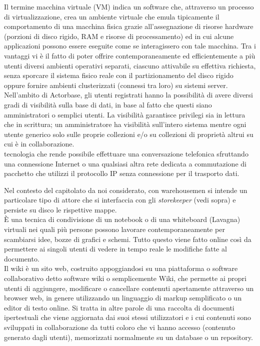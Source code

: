 \documentclass{scalatekids-article}
\begin{document}
   Il termine macchina virtuale (VM) indica un software che, attraverso un processo di virtualizzazione, crea un ambiente virtuale che emula tipicamente il comportamento di una macchina fisica grazie all'assegnazione di risorse hardware (porzioni di disco rigido, RAM e risorse di processamento) ed in cui alcune applicazioni possono essere eseguite come se interagissero con tale macchina.
  Tra i vantaggi vi è il fatto di poter offrire contemporaneamente ed efficientemente a più utenti diversi ambienti operativi separati, ciascuno attivabile su effettiva richiesta, senza sporcare il sistema fisico reale con il partizionamento del disco rigido oppure fornire ambienti clusterizzati (connessi tra loro) su sistemi server.
  \\

   Nell'ambito di Actorbase, gli utenti registrati hanno la possibilità di avere diversi gradi di visibilità sulla base di dati, in base al fatto che questi siano amministratori o semplici utenti.
  La visibilità garantisce privilegi sia in lettura che in scrittura; un amministratore ha visibilità sull'intero sistema mentre ogni utente generico solo sulle proprie collezioni e/o su collezioni di proprietà altrui su cui è in collaborazione.
  \\

   tecnologia che rende possibile effettuare una conversazione telefonica sfruttando una connessione Internet o una qualsiasi altra rete dedicata a commutazione di pacchetto che utilizzi il protocollo IP senza connessione per il trasporto dati.
  \\


   Nel contesto del capitolato da noi considerato, con warehousemen si intende un particolare tipo di attore che si interfaccia con gli \textit{storekeeper} (vedi sopra) e persiste su disco le rispettive mappe.
  \\

   È una tecnica di condivisione di un notebook o di una whiteboard (Lavagna) virtuali nei quali più persone possono lavorare contemporaneamente per scambiarsi idee, bozze di grafici e schemi.
  Tutto questo viene fatto online così da permettere ai singoli utenti di vedere in tempo reale le modifiche fatte al documento.
  \\

   Il wiki è un sito web, costruito appoggiandosi su una piattaforma o software collaborativo detto software wiki o semplicemente Wiki, che permette ai propri utenti di aggiungere, modificare o cancellare contenuti apertamente attraverso un browser web, in genere utilizzando un linguaggio di markup semplificato o un editor di testo online.
  Si tratta in altre parole di una raccolta di documenti ipertestuali che viene aggiornata dai suoi stessi utilizzatori e i cui contenuti sono sviluppati in collaborazione da tutti coloro che vi hanno accesso (contenuto generato dagli utenti), memorizzati normalmente su un database o un repository.
  \\



\end{document}
